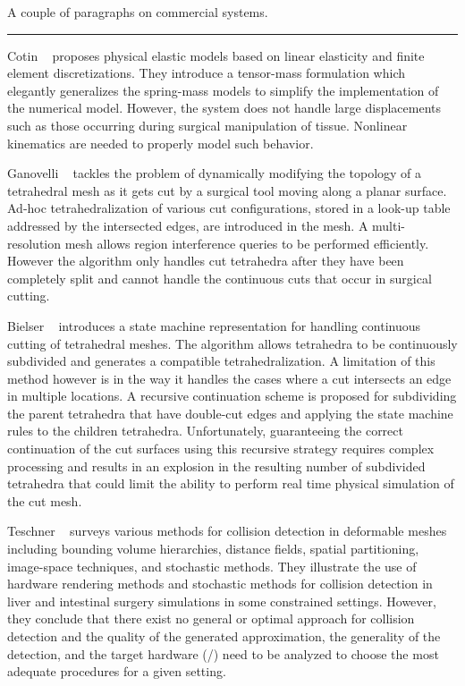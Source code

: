 A couple of paragraphs on commercial systems.

\hrule

Cotin \etal~\autocite{cotin:tvc:2000} proposes physical elastic models based on linear elasticity and finite element discretizations. They introduce a tensor-mass formulation which elegantly generalizes the spring-mass models to simplify the implementation of the numerical model. However, the system does not handle large displacements such as those occurring during surgical manipulation of tissue. Nonlinear kinematics are needed to properly model such behavior.

Ganovelli \etal~\autocite{ganovelli:tvc:2001} tackles the problem of dynamically modifying the topology of a  tetrahedral mesh as it gets cut by a surgical tool moving along a planar surface. Ad-hoc tetrahedralization of various cut configurations, stored in a look-up table addressed by the intersected edges, are introduced in the mesh. A multi-resolution mesh allows region interference queries to be performed efficiently. However the algorithm only handles cut tetrahedra after they have been completely split and cannot handle the continuous cuts that occur in surgical cutting.

Bielser \etal~\autocite{bielser:gm:2004} introduces a state machine representation for handling continuous cutting of tetrahedral meshes. The algorithm allows tetrahedra to be continuously subdivided and generates a compatible tetrahedralization. A limitation of this method however is in the way it handles the cases where a cut intersects an edge in multiple locations. A recursive continuation scheme is proposed for subdividing the parent tetrahedra that have double-cut edges and applying the state machine rules to the children tetrahedra. Unfortunately, guaranteeing the correct continuation of the cut surfaces using this recursive strategy requires complex processing and results in an explosion in the resulting number of subdivided tetrahedra that could limit the ability to perform real time physical simulation of the cut mesh.

Teschner \etal~\autocite{teschner:cgf:2005} surveys various methods for collision detection in deformable meshes including bounding volume hierarchies, distance fields, spatial partitioning, image-space techniques, and stochastic methods. They illustrate the use of hardware rendering methods and stochastic methods for collision detection in liver and intestinal surgery simulations in some constrained settings. However, they conclude that there exist no general or optimal approach for collision detection and the quality of the generated approximation, the generality of the detection, and the target hardware (/) need to be analyzed to choose the most adequate procedures for a given setting.

